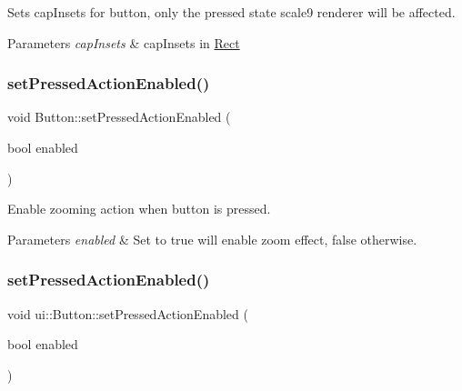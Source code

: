 Sets cap\+Insets for button, only the pressed state scale9 renderer will be affected.


\begin{DoxyParams}{Parameters}
{\em cap\+Insets} & cap\+Insets in \hyperlink{classRect}{Rect} \\
\hline
\end{DoxyParams}
\mbox{\label{classui_1_1Button_aad300285ea4adb05794a60e24363ade4}} 
\subsubsection{\texorpdfstring{set\+Pressed\+Action\+Enabled()}{setPressedActionEnabled()}\hspace{0.1cm}{\footnotesize\ttfamily [1/2]}}
{\footnotesize\ttfamily void Button\+::set\+Pressed\+Action\+Enabled (\begin{DoxyParamCaption}\item[{bool}]{enabled }\end{DoxyParamCaption})}

Enable zooming action when button is pressed.


\begin{DoxyParams}{Parameters}
{\em enabled} & Set to true will enable zoom effect, false otherwise. \\
\hline
\end{DoxyParams}
\mbox{\label{classui_1_1Button_ad86e0e1ea61cb339750da9f51c89671d}} 
\subsubsection{\texorpdfstring{set\+Pressed\+Action\+Enabled()}{setPressedActionEnabled()}\hspace{0.1cm}{\footnotesize\ttfamily [2/2]}}
{\footnotesize\ttfamily void ui\+::\+Button\+::set\+Pressed\+Action\+Enabled (\begin{DoxyParamCaption}\item[{bool}]{enabled }\end{DoxyParamCaption})}

